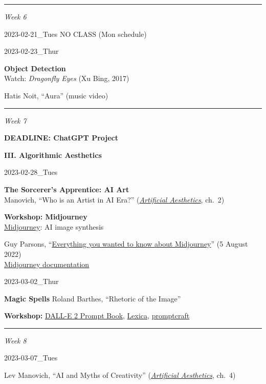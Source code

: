 \documentclass[
  letterpaper,
  DIV=11,
  numbers=noendperiod]{scrartcl}
\begin{document}
\begin{center}\rule{0.5\linewidth}{0.5pt}\end{center}

\emph{Week 6}

2023-02-21\_Tues NO CLASS (Mon schedule)

2023-02-23\_Thur

\textbf{Object Detection}\\
Watch: \emph{Dragonfly Eyes} (Xu Bing, 2017)

Hatis Noit, ``Aura'' (music video)

\begin{center}\rule{0.5\linewidth}{0.5pt}\end{center}

\emph{Week 7}

\textbf{DEADLINE: ChatGPT Project}

\textbf{III. Algorithmic Aesthetics}

2023-02-28\_Tues

\textbf{The Sorcerer's Apprentice: AI Art}\\
Manovich, ``Who is an Artist in AI Era?''
(\href{http://manovich.net/index.php/projects/artificial-aesthetics-book}{\emph{Artificial
Aesthetics}}, ch.~2)

\textbf{Workshop: Midjourney}\\
\href{https://www.midjourney.com/}{Midjourney}: AI image synthesis

Guy Parsons,
``\href{https://dallery.gallery/midjourney-guide-ai-art-explained/}{Everything
you wanted to know about Midjourney}'' (5 August 2022)\\
\href{https://midjourney.gitbook.io/docs/}{Midjourney documentation}

2023-03-02\_Thur

\textbf{Magic Spells} Roland Barthes, ``Rhetoric of the Image''

\textbf{Workshop:}
\href{https://canvas.emerson.edu/courses/1932613/files/144544393?wrap=1}{DALL-E
2 Prompt Book}, \href{https://lexica.art/}{Lexica},
\href{https://www.reddit.com/r/promptcraft/}{promptcraft}

\begin{center}\rule{0.5\linewidth}{0.5pt}\end{center}

\emph{Week 8}

2023-03-07\_Tues

Lev Manovich, ``AI and Myths of Creativity''
(\href{http://manovich.net/index.php/projects/artificial-aesthetics-book}{\emph{Artificial
Aesthetics}}, ch.~4)
\end{document}

